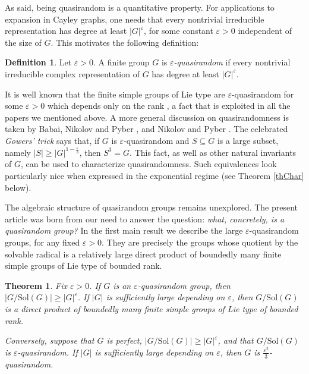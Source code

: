 \documentclass{daj}
\newtheorem{theoremX}{Theorem}
\theoremstyle{definition}
\newtheorem*{definition}{Definition}
\theoremstyle{remark}
\newcommand{\Sol}{\mathrm{Sol}}
\begin{document}
As said, being quasirandom is a quantitative property.
 For applications to expansion in Cayley graphs,
 one needs that every nontrivial irreducible representation has degree at least $|G|^\varepsilon$,
  for some constant $\varepsilon>0$ independent of the size of $G$.
  This motivates the following definition:
  
  \begin{definition}
Let $\varepsilon>0$.
A finite group $G$ is {\itshape $\varepsilon$-quasirandom} if every nontrivial irreducible complex representation of $G$
has degree at least $|G|^\varepsilon$.
\end{definition} 
  
It is well known that the finite simple groups of Lie type are $\varepsilon$-quasirandom
for some $\varepsilon>0$ which depends only on the rank \cite{LS74},
a fact that is exploited in all the papers we mentioned above.
A more general discussion on quasirandomness is taken by Babai, Nikolov and Pyber \cite{BNP08}, and Nikolov and Pyber \cite{NP11}.
The celebrated {\itshape Gowers' trick} \cite{NP11} says that,
if $G$ is $\varepsilon$-quasirandom and $S \subseteq G$ is a large subset, namely $|S| \geq |G|^{1-\frac{\varepsilon}{3}}$, then $S^3=G$.
This fact, as well as other natural invariants of $G$, can be used to characterize quasirandomness.
Such equivalences look particularly nice when expressed in the exponential regime (see Theorem \ref{thChar} below).

The algebraic structure of quasirandom groups remains unexplored.
 The present article was born from our need to answer the question:
 {\itshape what, concretely, is a quasirandom group?}
In the first main result we describe the large $\varepsilon$-quasirandom groups, for any fixed $\varepsilon >0$.
 They are precisely the groups whose quotient by the solvable radical
  is a relatively large direct product of boundedly many finite simple groups of Lie type of bounded rank.
 
\begin{theoremX} \label{thm:A}
	Fix $\varepsilon>0$.
	If $G$ is an $\varepsilon$-quasirandom group, then $|G/\Sol(G)| \geq |G|^\varepsilon$.
	If $|G|$ is sufficiently large depending on $\varepsilon$,
	then $G/\Sol(G)$ is a direct product of boundedly many finite simple groups of Lie type of bounded rank.
	
	Conversely, suppose that $G$ is perfect, $|G/\Sol(G)| \geq |G|^\varepsilon$, and that $G/\Sol(G)$ is $\varepsilon$-quasirandom.
	If $|G|$ is sufficiently large depending on $\varepsilon$,
	then $G$ is $\frac{\varepsilon^2}{3}$-quasirandom.
\end{theoremX} 
\end{document}
